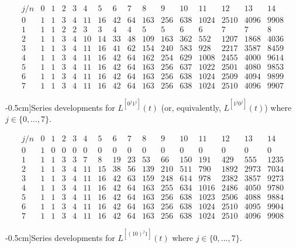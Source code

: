 \begin{table}
\begin{equation*}\begin{array}{c|ccccccccccccccc}j/n & 0 & 1 & 2 & 3 & 4 & 5 & 6 & 7 & 8 & 9 & 10 & 11 & 12 & 13 & 14\\\hline0 & 1 & 1 & 3 & 4 & 11 & 16 & 42 & 64 & 163 & 256 & 638 & 1024 & 2510 & 4096 & 9908\\1 & 1 & 1 & 2 & 2 & 3 & 3 & 4 & 4 & 5 & 5 & 6 & 6 & 7 & 7 & 8\\2 & 1 & 1 & 3 & 4 & 10 & 14 & 33 & 48 & 109 & 163 & 362 & 552 & 1207 & 1868 & 4036\\3 & 1 & 1 & 3 & 4 & 11 & 16 & 41 & 62 & 154 & 240 & 583 & 928 & 2217 & 3587 & 8459\\4 & 1 & 1 & 3 & 4 & 11 & 16 & 42 & 64 & 162 & 254 & 629 & 1008 & 2455 & 4000 & 9614\\5 & 1 & 1 & 3 & 4 & 11 & 16 & 42 & 64 & 163 & 256 & 637 & 1022 & 2501 & 4080 & 9853\\6 & 1 & 1 & 3 & 4 & 11 & 16 & 42 & 64 & 163 & 256 & 638 & 1024 & 2509 & 4094 & 9899\\7 & 1 & 1 & 3 & 4 & 11 & 16 & 42 & 64 & 163 & 256 & 638 & 1024 & 2510 & 4096 & 9907\end{array}\end{equation*}
\caption[][-0.5cm]{Series developments for $L^{[0^{j}1^j]}(t)$ (or, equivalently,
$L^{[1^{j}0^j]}(t)$) where $j\in \lbrace 0,\ldots,7 \rbrace$.}
\label{tbl:L0_j:1_j}
\end{table}

\begin{table}
\begin{equation*}\begin{array}{c|ccccccccccccccc}j/n & 0 & 1 & 2 & 3 & 4 & 5 & 6 & 7 & 8 & 9 & 10 & 11 & 12 & 13 & 14\\\hline0 & 1 & 0 & 0 & 0 & 0 & 0 & 0 & 0 & 0 & 0 & 0 & 0 & 0 & 0 & 0\\1 & 1 & 1 & 3 & 3 & 7 & 8 & 19 & 23 & 53 & 66 & 150 & 191 & 429 & 555 & 1235\\2 & 1 & 1 & 3 & 4 & 11 & 15 & 38 & 56 & 139 & 210 & 511 & 790 & 1892 & 2973 & 7034\\3 & 1 & 1 & 3 & 4 & 11 & 16 & 42 & 63 & 159 & 248 & 614 & 978 & 2382 & 3857 & 9273\\4 & 1 & 1 & 3 & 4 & 11 & 16 & 42 & 64 & 163 & 255 & 634 & 1016 & 2486 & 4050 & 9780\\5 & 1 & 1 & 3 & 4 & 11 & 16 & 42 & 64 & 163 & 256 & 638 & 1023 & 2506 & 4088 & 9884\\6 & 1 & 1 & 3 & 4 & 11 & 16 & 42 & 64 & 163 & 256 & 638 & 1024 & 2510 & 4095 & 9904\\7 & 1 & 1 & 3 & 4 & 11 & 16 & 42 & 64 & 163 & 256 & 638 & 1024 & 2510 & 4096 & 9908\end{array}\end{equation*}
\caption[][-0.5cm]{Series developments for $L^{[(10)^{j}1]}(t)$ where $j\in \lbrace 0,\ldots,7 \rbrace$.}
\label{tbl:L10_j:1}
\end{table}

